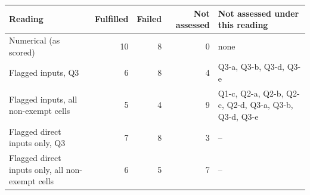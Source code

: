 \begin{tabular}{@{}lrrrl@{}}\toprule
Reading & Fulfilled & Failed & Not assessed & Not assessed under this reading \\\midrule
Numerical (as scored) & 10 & 8 & 0 & none \\
Flagged inputs, Q3 & 6 & 8 & 4 & Q3-a, Q3-b, Q3-d, Q3-e \\
Flagged inputs, all non-exempt cells & 5 & 4 & 9 & Q1-c, Q2-a, Q2-b, Q2-c, Q2-d, Q3-a, Q3-b, Q3-d, Q3-e \\
Flagged direct inputs only, Q3 & 7 & 8 & 3 & -- \\
Flagged direct inputs only, all non-exempt cells & 6 & 5 & 7 & -- \\
\bottomrule\end{tabular}
